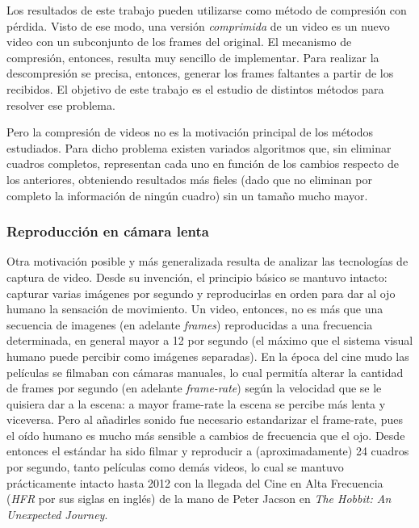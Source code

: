 Los resultados de este trabajo pueden utilizarse como método de compresión con pérdida. Visto de ese modo, una versión \emph{comprimida} de un video es un nuevo video con un subconjunto de los frames del original. El mecanismo de compresión, entonces, resulta muy sencillo de implementar. Para realizar la descompresión se precisa, entonces, generar los frames faltantes a partir de los recibidos. El objetivo de este trabajo es el estudio de distintos métodos para resolver ese problema.

Pero la compresión de videos no es la motivación principal de los métodos estudiados. Para dicho problema existen variados algoritmos que, sin eliminar cuadros completos, representan cada uno en función de los cambios respecto de los anteriores, obteniendo resultados más fieles (dado que no eliminan por completo la información de ningún cuadro) sin un tamaño mucho mayor\cite{wiki_data_compression_video}.

\subsubsection{Reproducción en cámara lenta}
Otra motivación posible y más generalizada resulta de analizar las tecnologías de captura de video. Desde su invención, el principio básico se mantuvo intacto: capturar varias imágenes por segundo y reproducirlas en orden para dar al ojo humano la sensación de movimiento. Un video, entonces, no es más que una secuencia de imagenes (en adelante \emph{frames}) reproducidas a una frecuencia determinada, en general mayor a 12 por segundo (el máximo que el sistema visual humano puede percibir como imágenes separadas\cite{wiki_framerate}). En la época del cine mudo las películas se filmaban con cámaras manuales, lo cual permitía alterar la cantidad de frames por segundo (en adelante \emph{frame-rate}) según la velocidad que se le quisiera dar a la escena: a mayor frame-rate la escena se percibe más lenta y viceversa. Pero al añadirles sonido fue necesario estandarizar el frame-rate, pues el oído humano es mucho más sensible a cambios de frecuencia que el ojo\cite{wiki_framerate}. Desde entonces el estándar ha sido filmar y reproducir a (aproximadamente) 24 cuadros por segundo, tanto películas como demás videos, lo cual se mantuvo prácticamente intacto hasta 2012 con la llegada del Cine en Alta Frecuencia (\emph{HFR} por sus siglas en inglés) de la mano de Peter Jacson en \emph{The Hobbit: An Unexpected Journey}.

